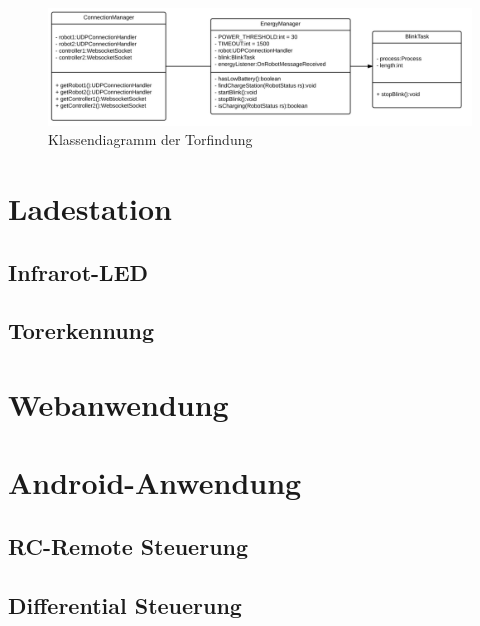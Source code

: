 \begin{figure}[h]
	\includegraphics[width=\textwidth]{images/uml_energymanager.pdf}
	\caption{Klassendiagramm der Torfindung}
	\label{fig:uml_energymanager}
\end{figure}


\section{Ladestation}



\subsection{Infrarot-LED}
\label{sec:infrarot_led}
\subsection{Torerkennung}

\section{Webanwendung}
\label{sec:webanwendung}

\section{Android-Anwendung}
\subsection{RC-Remote Steuerung}
\subsection{Differential Steuerung}
\label{sec:differentialsteuerung}

